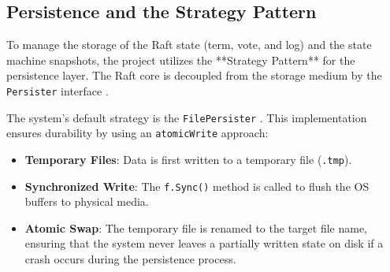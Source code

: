 \subsection{Persistence and the Strategy Pattern}
To manage the storage of the Raft state (term, vote, and log) and the state machine snapshots, the project utilizes the **Strategy Pattern** for the persistence layer. The Raft core is decoupled from the storage medium by the \texttt{Persister} interface \cite{raftapi_go}.

The system's default strategy is the \texttt{FilePersister} \cite{disk_persister_go}. This implementation ensures durability by using an \texttt{atomicWrite} approach:
\begin{itemize}
    \item \textbf{Temporary Files}: Data is first written to a temporary file (\texttt{.tmp}).
    \item \textbf{Synchronized Write}: The \texttt{f.Sync()} method is called to flush the OS buffers to physical media.
    \item \textbf{Atomic Swap}: The temporary file is renamed to the target file name, ensuring that the system never leaves a partially written state on disk if a crash occurs during the persistence process.
\end{itemize}